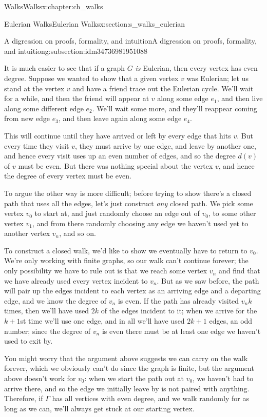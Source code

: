 \documentclass[oneside,10pt,]{book}
\numberwithin{equation}{section}
\begin{document}
\begin{chapterptx}{Walks}{}{Walks}{}{}{x:chapter:ch_walks}
\begin{sectionptx}{Eulerian Walks}{}{Eulerian Walks}{}{}{x:section:s_walks_eulerian}
\begin{subsectionptx}{A digression on proofs, formality, and intuition}{}{A digression on proofs, formality, and intuition}{}{}{g:subsection:idm34736981951088}
\par
It is much easier to see that if a graph \(G\) \emph{is} Eulerian, then every vertex has even degree.  Suppose we wanted to show that a given vertex \(v\) was Eulerian; let us stand at the vertex \(v\) and have a friend trace out the Eulerian cycle.  We'll wait for a while, and then the friend will appear at \(v\) along some edge \(e_1\), and then live along some different edge \(e_2\).  We'll wait some more, and they'll reappear coming from new edge \(e_3\), and then leave again along some edge \(e_4\).%
\par
This will continue until they have arrived or left by every edge that hits \(v\).  But every time they visit \(v\), they must arrive by one edge, and leave by another one, and hence every visit uses up an even number of edges, and so the degree \(d(v)\) of \(v\) must be even.  But there was nothing special about the vertex \(v\), and hence the degree of every vertex must be even.%
\par
To argue the other way is more difficult; before trying to show there's a closed path that uses all the edges, let's just construct \emph{any} closed path.  We pick some vertex \(v_0\) to start at, and just randomly choose an edge out of \(v_0\), to some other vertex \(v_1\), and from there randomly choosing any edge we haven't used yet to another vertex \(v_n\), and so on.%
\par
To construct a closed walk, we'd like to show we eventually have to return to \(v_0\).  We're only working with finite graphs, so our walk can't continue forever; the only possibility we have to rule out is that we reach some vertex \(v_n\) and find that we have already used every vertex incident to \(v_n\).  But as we saw before, the path will pair up the edges incident to each vertex as an arriving edge and a departing edge, and we know the degree of \(v_n\) is even.  If the path has already visited \(v_n k\) times, then we'll have used \(2k\) of the edges incident to it; when we arrive for the \(k+1\)st time we'll use one edge, and in all we'll have used \(2k+1\) edges, an odd number; since the degree of \(v_n\) is even there must be at least one edge we haven't used to exit by.%
\par
You might worry that the argument above suggests we can carry on the walk forever, which we obviously can't do since the graph is finite, but the argument above doesn't work for \(v_0\): when we start the path out at \(v_0\), we haven't had to arrive there, and so the edge we initially leave by is not paired with anything.  Therefore, if \(\Gamma\) has all vertices with even degree, and we walk randomly for as long as we can, we'll always get stuck at our starting vertex.%

\end{subsectionptx}
\end{sectionptx}
\end{chapterptx}
\end{document}
